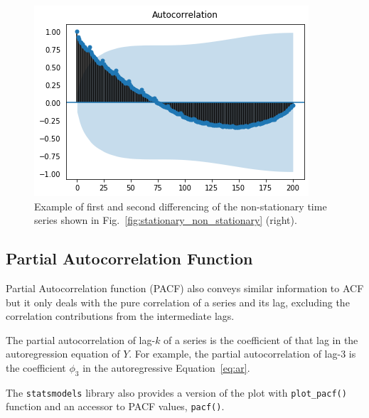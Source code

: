 \begin{figure}[htb]
	\centering
	\includegraphics[width=0.7\linewidth]{figures/acf_plot2.png}
	\caption{Example of first and second differencing of the non-stationary time series shown in Fig.~\ref{fig:stationary_non_stationary} (right).}
	\label{fig:acf2}
\end{figure}
    
\subsection{Partial Autocorrelation Function}
\label{partial-autocorrelation-function}

Partial Autocorrelation function (PACF) also conveys similar information
to ACF but it only deals with the pure correlation of a series and its
lag, excluding the correlation contributions from the intermediate lags.

The partial autocorrelation of lag-\(k\) of a series is the coefficient
of that lag in the autoregression equation of \(Y\). For example, 
the partial autocorrelation of lag-3 is the
coefficient \(\phi_3\) in the autoregressive Equation~\ref{eq:ar}.

The \texttt{statsmodels} library also provides a version of the plot with
\texttt{plot\_pacf()} function and an accessor to PACF values, \texttt{pacf()}.

